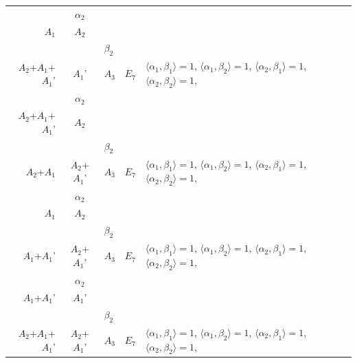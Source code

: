 \documentclass[12pt]{report}
\begin{document}
\begin{appendix}
{\begin{longtable}{rcl p{1cm}p{1cm}p{3cm} }
\begin{tabular}{cc}$\alpha_1$+ & $\alpha_2$\\\tiny{ $A_1$ } & \tiny{ $A_2$ }\end{tabular} &\begin{tabular}{c} = \\~ \end{tabular} & \begin{tabular}{cc}$\beta_1$+ & $\beta_2$\\\tiny{ $A_2$+$A_1$+$A_1$' } & \tiny{ $A_1$' }\end{tabular} & $A_3$ & $E_7$ &  $\langle\alpha_1, \beta_1\rangle=1$, $\langle\alpha_1, \beta_2\rangle=1$, $\langle\alpha_2, \beta_1\rangle=1$, $\langle\alpha_2, \beta_2\rangle=1$, 
\\
\begin{tabular}{cc}$\alpha_1$+ & $\alpha_2$\\\tiny{ $A_2$+$A_1$+$A_1$' } & \tiny{ $A_2$ }\end{tabular} &\begin{tabular}{c} = \\~ \end{tabular} & \begin{tabular}{cc}$\beta_1$+ & $\beta_2$\\\tiny{ $A_2$+$A_1$ } & \tiny{ $A_2$+$A_1$' }\end{tabular} & $A_3$ & $E_7$ &  $\langle\alpha_1, \beta_1\rangle=1$, $\langle\alpha_1, \beta_2\rangle=1$, $\langle\alpha_2, \beta_1\rangle=1$, $\langle\alpha_2, \beta_2\rangle=1$, 
\\
\begin{tabular}{cc}$\alpha_1$+ & $\alpha_2$\\\tiny{ $A_1$ } & \tiny{ $A_2$ }\end{tabular} &\begin{tabular}{c} = \\~ \end{tabular} & \begin{tabular}{cc}$\beta_1$+ & $\beta_2$\\\tiny{ $A_1$+$A_1$' } & \tiny{ $A_2$+$A_1$' }\end{tabular} & $A_3$ & $E_7$ &  $\langle\alpha_1, \beta_1\rangle=1$, $\langle\alpha_1, \beta_2\rangle=1$, $\langle\alpha_2, \beta_1\rangle=1$, $\langle\alpha_2, \beta_2\rangle=1$, 
\\
\begin{tabular}{cc}$\alpha_1$+ & $\alpha_2$\\\tiny{ $A_1$+$A_1$' } & \tiny{ $A_1$' }\end{tabular} &\begin{tabular}{c} = \\~ \end{tabular} & \begin{tabular}{cc}$\beta_1$+ & $\beta_2$\\\tiny{ $A_2$+$A_1$+$A_1$' } & \tiny{ $A_2$+$A_1$' }\end{tabular} & $A_3$ & $E_7$ &  $\langle\alpha_1, \beta_1\rangle=1$, $\langle\alpha_1, \beta_2\rangle=1$, $\langle\alpha_2, \beta_1\rangle=1$, $\langle\alpha_2, \beta_2\rangle=1$, 

\end{longtable}}
\end{appendix}
\end{document}
